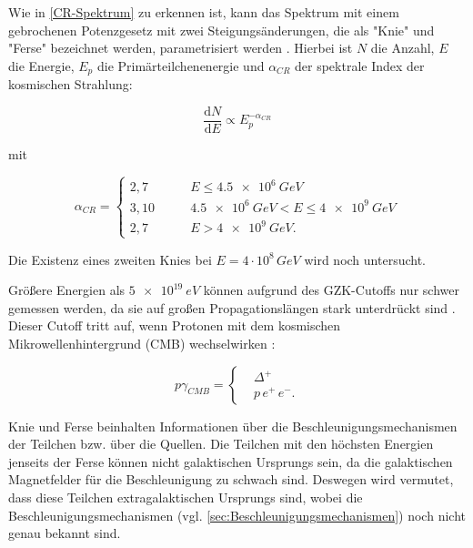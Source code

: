 Wie in \autoref{CR-Spektrum} zu erkennen ist, kann das Spektrum mit einem gebrochenen Potenzgesetz mit zwei Steigungsänderungen, die als "Knie" und "Ferse" bezeichnet werden, parametrisiert werden \cite{Knie}.
Hierbei ist $N$ die Anzahl, $E$ die Energie, $E_p$ die Primärteilchenenergie und $\alpha_{CR}$ der spektrale Index der kosmischen Strahlung:

\begin{equation}
 \frac{\mathrm{d}N}{\mathrm{d}E} \propto E_p^{-\alpha_{CR}}
\end{equation}

mit \cite{Knie} 

\begin{equation*}
\alpha_{CR}=	
\left\{
\begin{aligned}
2,7 \qquad &E   \leq \SI{4,5e6}{GeV} \\
3,10 \qquad &  \SI{4,5e6}{GeV} < E  \leq \SI{4e9}{GeV} \\ 
2,7 \qquad & E > \SI{4e9}{GeV}.
\end{aligned}
\right.
\end{equation*}

Die Existenz eines zweiten Knies bei $E=4\cdot 10^8\,\si{GeV}$\cite{Knie} wird noch untersucht.

Größere Energien als $\SI{5e19}{eV}$ können aufgrund des GZK-Cutoffs \cite{Greisen}\cite{ZatsepinKuzmin} nur schwer gemessen werden, da sie auf großen Propagationslängen stark unterdrückt sind . 
Dieser Cutoff tritt auf, wenn Protonen mit dem kosmischen Mikrowellenhintergrund (CMB) wechselwirken \cite{Greisen}\cite{ZatsepinKuzmin}: 

\begin{equation*}
p\gamma_{CMB}=	
\left\{
\begin{aligned}
& \Delta^+ \\
& p\, e^+ \, e^- .
\end{aligned}
\right.
\end{equation*}

Knie und Ferse beinhalten Informationen über die Beschleunigungsmechanismen der Teilchen bzw. über die Quellen.
Die Teilchen mit den höchsten Energien jenseits der Ferse können nicht galaktischen Ursprungs sein, da die galaktischen Magnetfelder für die Beschleunigung zu schwach sind. 
Deswegen wird vermutet, dass diese Teilchen extragalaktischen Ursprungs sind, wobei die Beschleunigungsmechanismen (vgl. \autoref{sec:Beschleunigungsmechanismen}) noch nicht genau bekannt sind.

